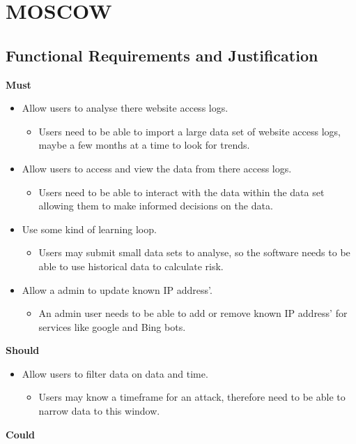 
\section{MOSCOW}
\subsection{Functional Requirements and Justification}
\textbf{Must}
\begin{itemize}
    \item Allow users to analyse there website access logs.
    \begin{itemize}
        \item Users need to be able to import a large data set of website access logs, maybe a few months at a time to look for trends.
    \end{itemize}
    \item Allow users to access and view the data from there access logs.
    \begin{itemize}
        \item Users need to be able to interact with the data within the data set allowing them to make informed decisions on the data.
    \end{itemize}
    \item Use some kind of learning loop.
    \begin{itemize}
        \item Users may submit small data sets to analyse, so the software needs to be able to use historical data to calculate risk.
    \end{itemize}
    \item Allow a admin to update known IP address'.
    \begin{itemize}
        \item An admin user needs to be able to add or remove known IP address' for services like google and Bing bots.
    \end{itemize}
\end{itemize}
\textbf{Should}
\begin{itemize}
    \item Allow users to filter data on data and time.
    \begin{itemize}
        \item Users may know a timeframe for an attack, therefore need to be able to narrow data to this window.
    \end{itemize}
\end{itemize}
\textbf{Could}

